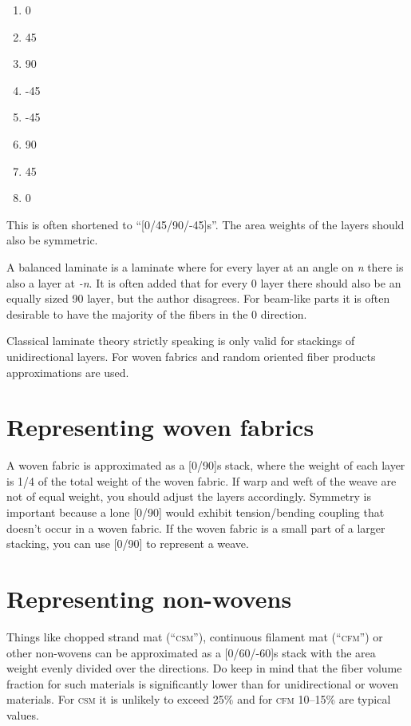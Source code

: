 \documentclass[a4paper,landscape,oneside,11pt,twocolumn]{memoir}
\begin{document}
\begin{enumerate}
    \item 0\textdegree
    \item 45\textdegree
    \item 90\textdegree
    \item -45\textdegree
    \item -45\textdegree
    \item 90\textdegree
    \item 45\textdegree
    \item 0\textdegree
\end{enumerate}

This is often shortened to “[0/45/90/-45]s”. The area weights of the layers
should also be symmetric.

A balanced laminate is a laminate where for every layer at an angle on
\emph{n}\textdegree{} there is also a layer at \emph{-n}\textdegree.
It is often added that for every 0\textdegree{} layer there should also be an
equally sized 90\textdegree{} layer, but the author disagrees. For beam-like
parts it is often desirable to have the majority of the fibers in the
0\textdegree{} direction.

Classical laminate theory strictly speaking is only valid for stackings of
unidirectional layers. For woven fabrics and random oriented fiber products
approximations are used.

\section{Representing woven fabrics}

A woven fabric is approximated as a [0\textdegree/90\textdegree]s stack, where
the weight of each layer is 1/4 of the total weight of the woven fabric. If
warp and weft of the weave are not of equal weight, you should adjust the
layers accordingly. Symmetry is important because a lone
[0\textdegree/90\textdegree] would exhibit tension/bending coupling that
doesn't occur in a woven fabric.
If the woven fabric is a small part of a larger stacking, you can use
[0\textdegree/90\textdegree] to represent a weave.


\section{Representing non-wovens}

Things like chopped strand mat (“\textsc{csm}”), continuous filament mat
(“\textsc{cfm}”) or other non-wovens can be approximated as
a [0\textdegree/60\textdegree/-60\textdegree]s stack with the area weight
evenly divided over the directions. Do keep in mind that the fiber volume
fraction for such materials is significantly lower than for unidirectional or
woven materials. For \textsc{csm} it is unlikely to exceed 25\% and for
\textsc{cfm} 10--15\% are typical values.
\end{document}
